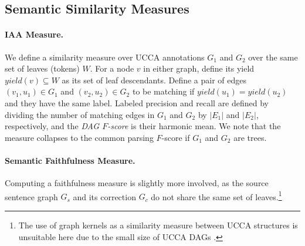\documentclass[letter,11pt]{article}
\begin{document}




\subsection{Semantic Similarity Measures}


\paragraph{IAA Measure.} We define a similarity measure over UCCA annotations 
$G_1$ and $G_2$ over the same set of leaves (tokens) $W$.
For a node $v$ in either graph, define its yield $yield(v) \subseteq W$ as its
set of leaf descendants.
Define a pair of edges $(v_1,u_1) \in G_1$ and $(v_2,u_2) \in G_2$ to be matching
if $yield(u_1) = yield(u_2)$ and they have the same label.
Labeled precision and recall are defined by dividing the number of matching edges
in $G_1$ and $G_2$ by $|E_1|$ and $|E_2|$, respectively, and
the {\it DAG $F$-score} is their harmonic mean.
We note that the measure collapses to the common parsing $F$-score if $G_1$ and $G_2$ are trees.

\paragraph{Semantic Faithfulness Measure.} Computing a faithfulness
measure is slightly more involved, as the source sentence graph $G_s$ and its
correction $G_c$ do not share the same set of leaves.\footnote{The use of graph kernels
  as a similarity measure between UCCA 
  structures is unsuitable here due to the small size of UCCA DAGs \cite{kashima2003marginalized}.} 
\end{document}

